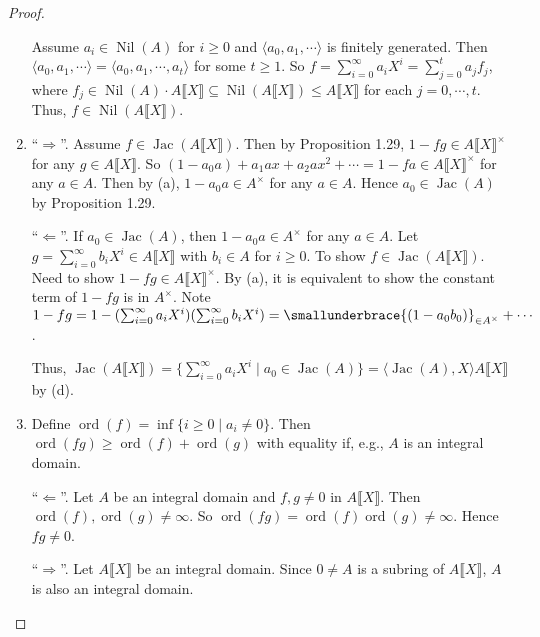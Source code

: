 \begin{proof}
\begin{enumerate}
            Assume $a_i \in \operatorname{Nil}(A)$ for $i \geq 0$ and $\langle a_0,a_1,\cdots \rangle$ is finitely generated. Then $\langle a_0,a_1,\cdots \rangle = \langle a_0,a_1,\cdots,a_t \rangle$ for some $t \geq 1$. So $f = \sum_{i=0}^\infty a_iX^i = \sum_{j=0}^t a_jf_j$, where $f_j \in \operatorname{Nil}(A) \cdot A \llbracket X \rrbracket \subseteq \operatorname{Nil}(A\llbracket X \rrbracket) \leq A\llbracket X \rrbracket$ for each $j = 0,\cdots,t$. Thus, $f \in \operatorname{Nil}(A\llbracket X \rrbracket)$. 
        \item  ``$\Rightarrow$''. Assume $f \in \operatorname{Jac}(A\llbracket X \rrbracket)$. Then by Proposition 1.29, $1-fg \in A\llbracket X \rrbracket^\times$ for any $g \in A\llbracket X \rrbracket$. So $(1-a_0a) + a_1ax + a_2ax^2 + \cdots = 1-fa \in A\llbracket X \rrbracket^\times$ for any $a \in A$. Then by (a), $1-a_0a \in A^\times$ for any $a \in A$. Hence $a_0 \in \operatorname{Jac}(A)$ by Proposition 1.29. \par 
            ``$\Leftarrow$''. If $a_0 \in \operatorname{Jac}(A)$, then $1-a_0a \in A^\times$ for any $a \in A$. Let $g = \sum_{i=0}^\infty b_iX^i \in A\llbracket X \rrbracket$ with $b_i \in A$ for $i \geq 0$. To show $f \in \operatorname{Jac}(A\llbracket X \rrbracket)$. Need to show $1-fg \in A\llbracket X \rrbracket^\times$. By (a), it is equivalent to show the constant term of $1-fg$ is in $A^\times$. Note $1-fg = 1-(\sum_{i=0}^\infty a_iX^i)(\sum_{i=0}^\infty b_iX^i) = \smallunderbrace{(1-a_0b_0)}_{\in A^\times} + \cdots$. \par 
            Thus, $\operatorname{Jac}(A\llbracket X \rrbracket) = \{\sum_{i=0}^\infty a_iX^i \mid a_0 \in \operatorname{Jac}(A)\} = \langle \operatorname{Jac}(A),X \rangle A \llbracket X \rrbracket$ by (d). 
        \item 
            Define $\operatorname{ord}(f) = \inf\{i \geq 0 \mid a_i \neq 0\}$. Then $\operatorname{ord}(fg) \geq \operatorname{ord}(f) + \operatorname{ord}(g)$ with equality if, e.g., $A$ is an integral domain. \par 
            ``$\Leftarrow$''. Let $A$ be an integral domain and $f,g \neq 0$ in $A\llbracket X \rrbracket$. Then $\operatorname{ord}(f),\operatorname{ord}(g) \neq \infty$. So $\operatorname{ord}(fg) = \operatorname{ord}(f)\operatorname{ord}(g) \neq \infty$. Hence $fg \neq 0$. \par
            ``$\Rightarrow$''. Let $A\llbracket X \rrbracket$ be an integral domain. Since $0 \neq A$ is a subring of $A\llbracket X \rrbracket$, $A$ is also an integral domain. \par

\end{enumerate}
\end{proof}
